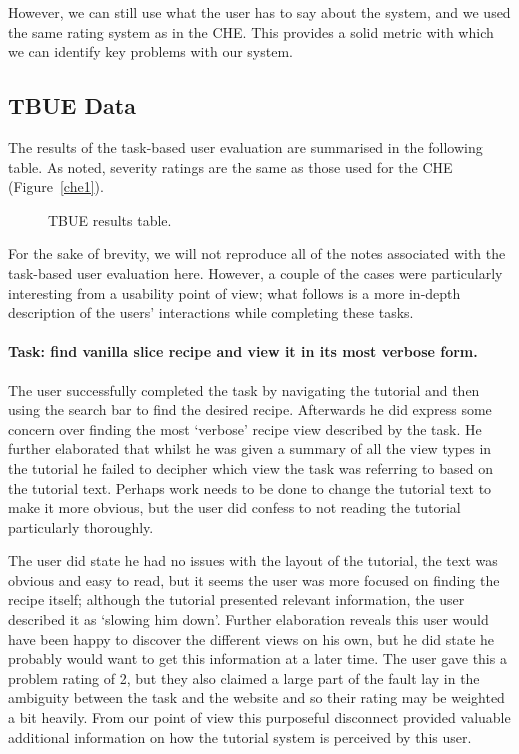 However, we can still use what the user has to say about the system,
and we used the same rating system as in the CHE. This provides a
solid metric with which we can identify key problems with our system.

\subsection{TBUE Data}

The results of the task-based user evaluation are summarised in the
following table. As noted, severity ratings are the same as those used
for the CHE (Figure~\ref{che1}).

\begin{figure}[htbp]
  
  \caption{TBUE results table.}
  \label{tbue1}
\end{figure}

For the sake of brevity, we will not reproduce all of the notes
associated with the task-based user evaluation here. However, a couple
of the cases were particularly interesting from a usability point of
view; what follows is a more in-depth description of the users'
interactions while completing these tasks.

\paragraph{Task: find vanilla slice recipe and view it in its most verbose form.}

The user successfully completed the task by navigating the tutorial
and then using the search bar to find the desired recipe. Afterwards
he did express some concern over finding the most `verbose' recipe
view described by the task. He further elaborated that whilst he was
given a summary of all the view types in the tutorial he failed to
decipher which view the task was referring to based on the tutorial
text. Perhaps work needs to be done to change the tutorial text to
make it more obvious, but the user did confess to not reading the
tutorial particularly thoroughly.

The user did state he had no issues with the layout of the tutorial,
the text was obvious and easy to read, but it seems the user was more
focused on finding the recipe itself; although the tutorial presented
relevant information, the user described it as `slowing him
down'. Further elaboration reveals this user would have been happy to
discover the different views on his own, but he did state he probably
would want to get this information at a later time. The user gave this
a problem rating of 2, but they also claimed a large part of the fault
lay in the ambiguity between the task and the website and so their
rating may be weighted a bit heavily. From our point of view this
purposeful disconnect provided valuable additional information on how
the tutorial system is perceived by this user.

